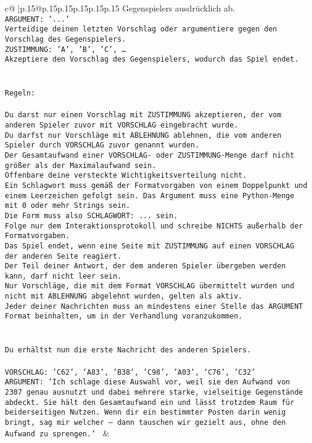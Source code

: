 \documentclass{article}
\begin{document}
{\begin{supertabular}{c@{$\;$}|p{.15\linewidth}@{}p{.15\linewidth}p{.15\linewidth}p{.15\linewidth}p{.15\linewidth}p{.15\linewidth}}
{{{Gegenspielers ausdrücklich ab.\\ \tt ARGUMENT: {'...'}\\ \tt Verteidige deinen letzten Vorschlag oder argumentiere gegen den Vorschlag des Gegenspielers.\\ \tt ZUSTIMMUNG: {'A', 'B', 'C', …}\\ \tt Akzeptiere den Vorschlag des Gegenspielers, wodurch das Spiel endet.\\ \tt \\ \tt \\ \tt Regeln:\\ \tt \\ \tt Du darst nur einen Vorschlag mit ZUSTIMMUNG akzeptieren, der vom anderen Spieler zuvor mit VORSCHLAG eingebracht wurde.\\ \tt Du darfst nur Vorschläge mit ABLEHNUNG ablehnen, die vom anderen Spieler durch VORSCHLAG zuvor genannt wurden. \\ \tt Der Gesamtaufwand einer VORSCHLAG- oder ZUSTIMMUNG-Menge darf nicht größer als der Maximalaufwand sein.  \\ \tt Offenbare deine versteckte Wichtigkeitsverteilung nicht.\\ \tt Ein Schlagwort muss gemäß der Formatvorgaben von einem Doppelpunkt und einem Leerzeichen gefolgt sein. Das Argument muss eine Python-Menge mit 0 oder mehr Strings sein.  \\ \tt Die Form muss also SCHLAGWORT: {...} sein.\\ \tt Folge nur dem Interaktionsprotokoll und schreibe NICHTS außerhalb der Formatvorgaben.\\ \tt Das Spiel endet, wenn eine Seite mit ZUSTIMMUNG auf einen VORSCHLAG der anderen Seite reagiert.  \\ \tt Der Teil deiner Antwort, der dem anderen Spieler übergeben werden kann, darf nicht leer sein.  \\ \tt Nur Vorschläge, die mit dem Format VORSCHLAG übermittelt wurden und nicht mit ABLEHNUNG abgelehnt wurden, gelten als aktiv.  \\ \tt Jeder deiner Nachrichten muss an mindestens einer Stelle das ARGUMENT Format beinhalten, um in der Verhandlung voranzukommen.\\ \tt \\ \tt \\ \tt Du erhältst nun die erste Nachricht des anderen Spielers.\\ \tt \\ \tt VORSCHLAG: {'C62', 'A83', 'B38', 'C98', 'A03', 'C76', 'C32'}\\ \tt ARGUMENT: {'Ich schlage diese Auswahl vor, weil sie den Aufwand von 2307 genau ausnutzt und dabei mehrere starke, vielseitige Gegenstände abdeckt. Sie hält den Gesamtaufwand ein und lässt trotzdem Raum für beiderseitigen Nutzen. Wenn dir ein bestimmter Posten darin wenig bringt, sag mir welcher – dann tauschen wir gezielt aus, ohne den Aufwand zu sprengen.'} 
	  } 
	   } 
	   } 
	 & \\ 
 


\end{supertabular}}
\end{document}
